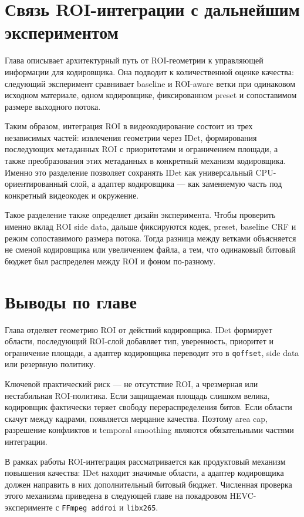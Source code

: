 \documentclass[12pt,a4paper,oneside,openany]{report}
\begin{document}

\section{Связь ROI-интеграции с дальнейшим экспериментом}

Глава описывает архитектурный путь от ROI-геометрии к управляющей информации для кодировщика.
Она подводит к количественной оценке качества: следующий эксперимент сравнивает baseline и
ROI-aware ветки при одинаковом исходном материале, одном кодировщике, фиксированном preset и
сопоставимом размере выходного потока.

Таким образом, интеграция ROI в видеокодирование состоит из трех независимых частей: извлечения
геометрии через IDet, формирования последующих метаданных ROI с приоритетами и ограничением
площади, а также преобразования этих метаданных в конкретный механизм кодировщика. Именно это
разделение позволяет сохранять IDet как универсальный CPU-ориентированный слой, а адаптер
кодировщика --- как заменяемую часть под конкретный видеокодек и окружение.

Такое разделение также определяет дизайн эксперимента. Чтобы проверить именно вклад ROI side
data, дальше фиксируются кодек, preset, baseline CRF и режим сопоставимого размера потока. Тогда
разница между ветками объясняется не сменой кодировщика или увеличением файла, а тем, что
одинаковый битовый бюджет был распределен между ROI и фоном по-разному.


\section{Выводы по главе}

Глава отделяет геометрию ROI от действий кодировщика. IDet формирует области, последующий
ROI-слой добавляет тип, уверенность, приоритет и ограничение площади, а адаптер кодировщика
переводит это в \texttt{qoffset}, side data или резервную политику.

Ключевой практический риск --- не отсутствие ROI, а чрезмерная или нестабильная ROI-политика.
Если защищаемая площадь слишком велика, кодировщик фактически теряет свободу перераспределения
битов. Если области скачут между кадрами, появляется мерцание качества. Поэтому area cap,
разрешение конфликтов и temporal smoothing являются обязательными частями интеграции.

В рамках работы ROI-интеграция рассматривается как продуктовый механизм повышения качества:
IDet находит значимые области, а адаптер кодировщика должен направить в них дополнительный
битовый бюджет. Численная проверка этого механизма приведена в следующей главе на покадровом
HEVC-эксперименте с \texttt{FFmpeg addroi} и \texttt{libx265}.
\end{document}
